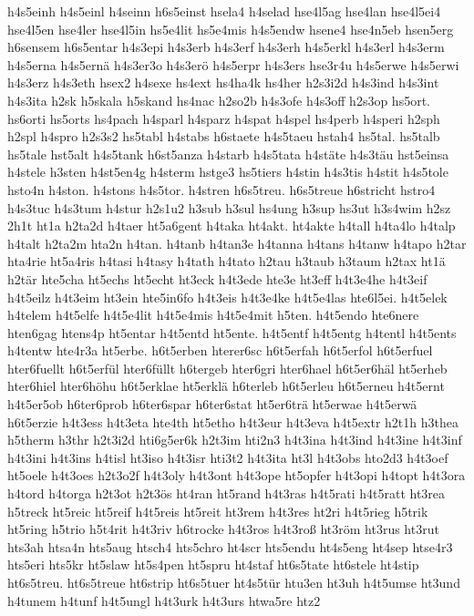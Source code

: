 {h4s5einh
h4s5einl
h4seinn
h6s5einst
hsela4
h4selad
hse4l5ag
hse4lan
hse4l5ei4
hse4l5en
hse4ler
hse4l5in
hs5e4lit
hs5e4mis
h4s5endw
hsene4
hse4n5eb
hsen5erg
h6sensem
h6s5entar
h4s3epi
h4s3erb
h4s3erf
h4s3erh
h4s5erkl
h4s3erl
h4s3erm
h4s5erna
h4s5ernä
h4s3er3o
h4s3erö
h4s5erpr
h4s3ers
hse3r4u
h4s5erwe
h4s5erwi
h4s3erz
h4s3eth
hsex2
h4sexe
hs4ext
hs4ha4k
hs4her
h2s3i2d
h4s3ind
h4s3int
h4s3ita
h2sk
h5skala
h5skand
hs4nac
h2so2b
h4s3ofe
h4s3off
h2s3op
hs5ort.
hs6orti
hs5orts
hs4pach
h4sparl
h4sparz
h4spat
h4spel
hs4perb
h4speri
h2sph
h2spl
h4spro
h2s3s2
hs5tabl
h4stabs
h6staete
h4s5taeu
hstah4
hs5tal.
hs5talb
hs5tale
hst5alt
h4s5tank
h6st5anza
h4starb
h4s5tata
h4stäte
h4s3täu
hst5einsa
h4stele
h3sten
h4st5en4g
h4sterm
hstge3
hs5tiers
h4stin
h4s3tis
h4stit
h4s5tole
hsto4n
h4ston.
h4stons
h4s5tor.
h4stren
h6s5treu.
h6s5treue
h6stricht
hstro4
h4s3tuc
h4s3tum
h4stur
h2s1u2
h3sub
h3sul
hs4ung
h3sup
hs3ut
h3s4wim
h2sz
2h1t
ht1a
h2ta2d
h4taer
ht5a6gent
h4taka
ht4akt.
ht4akte
h4tall
h4ta4lo
h4talp
h4talt
h2ta2m
hta2n
h4tan.
h4tanb
h4tan3e
h4tanna
h4tans
h4tanw
h4tapo
h2tar
hta4rie
ht5a4ris
h4tasi
h4tasy
h4tath
h4tato
h2tau
h3taub
h3taum
h2tax
ht1ä
h2tär
hte5cha
ht5echs
ht5echt
ht3eck
h4t3ede
hte3e
ht3eff
h4t3e4he
h4t3eif
h4t5eilz
h4t3eim
ht3ein
hte5in6fo
h4t3eis
h4t3e4ke
h4t5e4las
hte6l5ei.
h4t5elek
h4telem
h4t5elfe
h4t5e4lit
h4t5e4mis
h4t5e4mit
h5ten.
h4t5endo
hte6nere
hten6gag
htens4p
ht5entar
h4t5entd
ht5ente.
h4t5entf
h4t5entg
h4tentl
h4t5ents
h4tentw
hte4r3a
ht5erbe.
h6t5erben
hterer6sc
h6t5erfah
h6t5erfol
h6t5erfuel
hter6fuellt
h6t5erfül
hter6füllt
h6tergeb
hter6gri
hter6hael
h6t5er6häl
ht5erheb
hter6hiel
hter6höhu
h6t5erklae
ht5erklä
h6terleb
h6t5erleu
h6t5erneu
h4t5ernt
h4t5er5ob
h6ter6prob
h6ter6spar
h6ter6stat
ht5er6trä
ht5erwae
h4t5erwä
h6t5erzie
h4t3ess
h4t3eta
hte4th
ht5etho
h4t3eur
h4t3eva
h4t5extr
h2t1h
h3thea
h5therm
h3thr
h2t3i2d
hti6g5er6k
h2t3im
hti2n3
h4t3ina
h4t3ind
h4t3ine
h4t3inf
h4t3ini
h4t3ins
h4tisl
ht3iso
h4t3isr
hti3t2
h4t3ita
ht3l
h4t3obs
hto2d3
h4t3oef
ht5oele
h4t3oes
h2t3o2f
h4t3oly
h4t3ont
h4t3ope
ht5opfer
h4t3opi
h4topt
h4t3ora
h4tord
h4torga
h2t3ot
h2t3ös
ht4ran
ht5rand
h4t3ras
h4t5rati
h4t5ratt
ht3rea
h5treck
ht5reic
ht5reif
h4t5reis
ht5reit
ht3rem
h4t3res
ht2ri
h4t5rieg
h5trik
ht5ring
h5trio
h5t4rit
h4t3riv
h6trocke
h4t3ros
h4t3roß
ht3röm
ht3rus
ht3rut
hts3ah
htsa4n
hts5aug
htsch4
hts5chro
ht4scr
hts5endu
ht4s5eng
ht4sep
htse4r3
hts5eri
hts5kr
ht5slaw
ht5s4pen
ht5spru
ht4staf
ht6s5tate
ht6stele
ht4stip
ht6s5treu.
ht6s5treue
ht6strip
ht6s5tuer
ht4s5tür
htu3en
ht3uh
h4t5umse
ht3und
h4tunem
h4tunf
h4t5ungl
h4t3urk
h4t3urs
htwa5re
htz2
}
